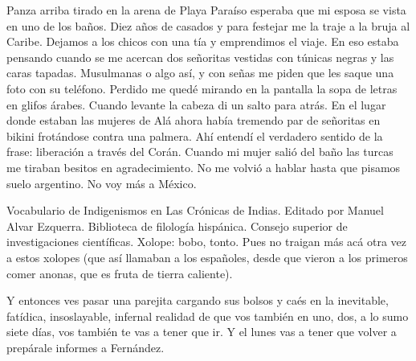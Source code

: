 \documentclass[11pt,twoside,openright,a6paper]{book}
\begin{document}
\vspace{0.5cm}
\hrulefill\hspace{0.2cm} \decofourleft\decofourright \hspace{0.2cm} \hrulefill
\vspace{0.5cm}

Panza arriba tirado en la arena de Playa Paraíso esperaba que mi esposa se
vista en uno de los baños. Diez años de casados y para festejar me la traje
a la bruja al Caribe. Dejamos a los chicos con una tía y emprendimos el
viaje. En eso estaba pensando cuando se me acercan dos señoritas vestidas
con túnicas negras y las caras tapadas. Musulmanas o algo así, y con
señas me piden que les saque una foto con su teléfono. Perdido me quedé
mirando en la pantalla la sopa de letras en glifos árabes. Cuando levante
la cabeza di un salto para atrás. En el lugar donde estaban las mujeres de
Alá ahora había tremendo par de señoritas en bikini frotándose contra
una palmera. Ahí entendí el verdadero sentido de la frase: liberación a
través del Corán. Cuando mi mujer salió del baño las turcas me tiraban
besitos en agradecimiento. No me volvió a hablar hasta que pisamos suelo
argentino. No voy más a México.


\vspace{0.5cm}
\hrulefill\hspace{0.2cm} \decofourleft\decofourright \hspace{0.2cm} \hrulefill
\vspace{0.5cm}

Vocabulario de Indigenismos en Las Crónicas de Indias. Editado por  Manuel
Alvar Ezquerra. Biblioteca de filología hispánica. Consejo superior de
investigaciones científicas. Xolope: bobo, tonto. Pues no traigan más
acá otra vez a estos xolopes (que así llamaban a los españoles, desde
que vieron a los primeros comer anonas, que es fruta de tierra caliente).


\vspace{0.5cm}
\hrulefill\hspace{0.2cm} \decofourleft\decofourright \hspace{0.2cm} \hrulefill
\vspace{0.5cm}

Y entonces ves pasar una parejita cargando sus bolsos y caés en la
inevitable, fatídica, insoslayable, infernal realidad de que vos también en
uno, dos, a lo sumo siete días, vos también te vas a tener que ir. Y
el lunes vas a tener que volver a prepárale informes a Fernández.
\end{document}
